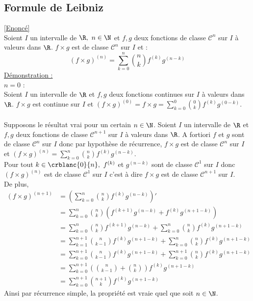 \documentclass{book}
\begin{document}
	\subsection{Formule de Leibniz }\label{sec:formule-de-leibniz-etoile1}
	\textcolor{blue}{\hyperref[leibniz]{[Enoncé]}}\\
	Soient $I$ un intervalle de $\R,\ n\in \N$ et $f,g$ deux fonctions de classe $\mathcal C^n$ sur $I$ à valeurs dans $\R$. $f\times g$ est de classe $\mathcal C^n$ sur $I$ et :
	\[(f\times g)^{(n)}=\displaystyle\sum_{k=0}^n\binom{n}{k}f^{(k)}g^{(n-k)}\]
	\underline{Démonstration :}\\
	$n=0$ :\\
	Soient $I$ un intervalle de $\R$ et $f,g$ deux fonctions continues sur $I$ à valeurs dans $\R$. $f\times g$ est continue sur $I$ et $(f\times g)^{(0)}=f\times g=\displaystyle\sum_{k=0}^0\binom{0}{k}f^{(k)}g^{(0-k)}$.\\\\
	Supposons le résultat vrai pour un certain $n\in \N$. Soient $I$ un intervalle de $\R$ et $f,g$ deux fonctions de classe $\mathcal C^{n+1}$ sur $I$ à valeurs dans $\R$. A fortiori $f$ et $g$ sont de classe $\mathcal C^n$ sur $I$ donc par hypothèse de récurrence, $f\times g$ est de classe $\mathcal C^n$ sur $I$ et $(f\times g)^{(n)}=\displaystyle\sum_{k=0}^n\binom{n}{k}f^{(k)}g^{(n-k)}$.\\
	Pour tout $k\in \crblanc{0}{n},\ f^{(k)}$ et $g^{(n-k)}$ sont de classe $\mathcal C^1$ sur $I$ donc $(f\times g)^{(n)}$ est de classe $\mathcal C^1$ sur $I$ c'est à dire $f\times g$ est de classe $\mathcal C^{n+1}$ sur $I$.\\
	De plus,
	\begin{align*}
		(f\times g)^{(n+1)}&=\displaystyle\left(\sum_{k=0}^n\binom{n}{k}f^{(k)}g^{(n-k)}\right)'\\
		&=\sum_{k=0}^n\binom{n}{k}\left(f^{(k+1)}g^{(n-k)}+f^{(k)}g^{(n+1-k)}\right)\\
		&=\sum_{k=0}^n\binom{n}{k}f^{(k+1)}g^{(n-k)}+\sum_{k=0}^n\binom{n}{k}f^{(k)}g^{(n+1-k)}\\
		&=\sum_{k=1}^{n+1}\binom{n}{k-1}f^{(k)}g^{(n+1-k)}+\sum_{k=0}^n\binom{n}{k}f^{(k)}g^{(n+1-k)}\\
		&=\sum_{k=0}^{n+1}\binom{n}{k-1}f^{(k)}g^{(n+1-k)}+\sum_{k=0}^{n+1}\binom{n}{k}f^{(k)}g^{(n+1-k)}\\
		&=\sum_{k=0}^{n+1}\left(\binom{n}{k-1}+\binom{n}{k}\right)f^{(k)}g^{(n+1-k)}\\
		&=\sum_{k=0}^{n+1}\binom{n+1}{k}f^{(k)}g^{(n+1-k)}
	\end{align*}
	Ainsi par récurrence simple, la propriété est vraie quel que soit $n\in \N$.
	
\end{document}
